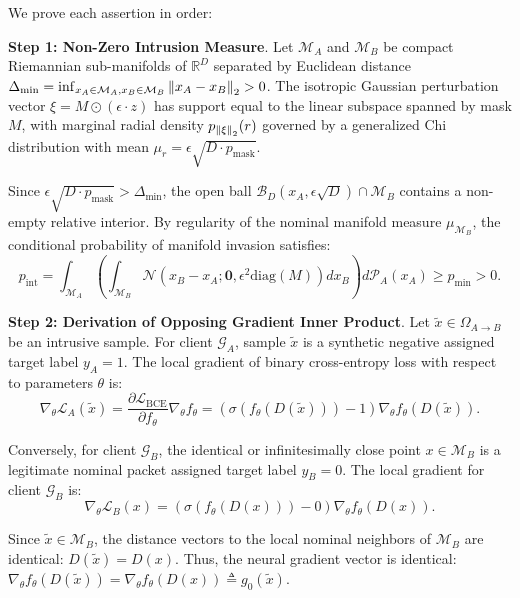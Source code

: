 \begin{IEEEproof}
We prove each assertion in order:

\textbf{Step 1: Non-Zero Intrusion Measure}.
Let $\mathcal{M}_A$ and $\mathcal{M}_B$ be compact Riemannian sub-manifolds of $\mathbb{R}^D$ separated by Euclidean distance $\Delta_{\min} = \inf_{x_A \in \mathcal{M}_A, x_B \in \mathcal{M}_B} \left\lVert x_A - x_B\right\rVert_2 > 0$. The isotropic Gaussian perturbation vector $\xi = M \odot (\epsilon \cdot z)$ has support equal to the linear subspace spanned by mask $M$, with marginal radial density $p_{\left\lVert\xi\right\rVert_2}(r)$ governed by a generalized Chi distribution with mean $\mu_r = \epsilon \sqrt{D \cdot p_{\text{mask}}}$. 

Since $\epsilon \sqrt{D \cdot p_{\text{mask}}} > \Delta_{\min}$, the open ball $\mathcal{B}_D(x_A, \epsilon \sqrt{D}) \cap \mathcal{M}_B$ contains a non-empty relative interior. By regularity of the nominal manifold measure $\mu_{\mathcal{M}_B}$, the conditional probability of manifold invasion satisfies:
\begin{equation}
p_{\text{int}} = \int_{\mathcal{M}_A} \left( \int_{\mathcal{M}_B} \mathcal{N}\left(x_B - x_A; \mathbf{0}, \epsilon^2 \text{diag}(M)\right) dx_B \right) d\mathcal{P}_A(x_A) \ge p_{\min} > 0.
\end{equation}

\textbf{Step 2: Derivation of Opposing Gradient Inner Product}.
Let $\tilde{x} \in \Omega_{A \to B}$ be an intrusive sample. For client $\mathcal{G}_A$, sample $\tilde{x}$ is a synthetic negative assigned target label $y_A = 1$. The local gradient of binary cross-entropy loss with respect to parameters $\theta$ is:
\begin{equation}
\label{eq:grad_A_proof}
\nabla_\theta \mathcal{L}_A(\tilde{x}) = \frac{\partial \mathcal{L}_{\text{BCE}}}{\partial f_\theta} \nabla_\theta f_\theta = \left( \sigma(f_\theta(D(\tilde{x}))) - 1 \right) \nabla_\theta f_\theta(D(\tilde{x})).
\end{equation}

Conversely, for client $\mathcal{G}_B$, the identical or infinitesimally close point $x \in \mathcal{M}_B$ is a legitimate nominal packet assigned target label $y_B = 0$. The local gradient for client $\mathcal{G}_B$ is:
\begin{equation}
\label{eq:grad_B_proof}
\nabla_\theta \mathcal{L}_B(x) = \left( \sigma(f_\theta(D(x))) - 0 \right) \nabla_\theta f_\theta(D(x)).
\end{equation}

Since $\tilde{x} \in \mathcal{M}_B$, the distance vectors to the local nominal neighbors of $\mathcal{M}_B$ are identical: $D(\tilde{x}) = D(x)$. Thus, the neural gradient vector is identical: $\nabla_\theta f_\theta(D(\tilde{x})) = \nabla_\theta f_\theta(D(x)) \triangleq g_0(\tilde{x})$. 


\end{IEEEproof}
